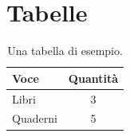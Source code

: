 \documentclass[a4paper,11pt]{article} %
\begin{document}
\section{Tabelle} %
\begin{table}[htbp] %
  \centering %
  \begin{tabular}{lc} %
    \hline %
    Voce & Quantità \\ %
    \hline %
    Libri & 3 \\ %
    Quaderni & 5 \\ %
    \hline %
  \end{tabular} %
  \caption{Una tabella di esempio.} %
  \label{tab:esempio} %
\end{table} %



\end{document}
